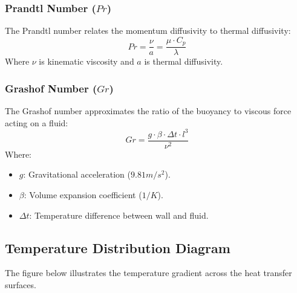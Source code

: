 \subsubsection{Prandtl Number ($Pr$)}\label{pr-number}

The Prandtl number relates the momentum diffusivity to thermal diffusivity:
\begin{equation}
    Pr = \frac{\nu}{a} = \frac{\mu \cdot C_p}{\lambda}
\end{equation}
Where $\nu$ is kinematic viscosity and $a$ is thermal diffusivity.

\subsubsection{Grashof Number ($Gr$)}\label{gr-number}

The Grashof number approximates the ratio of the buoyancy to viscous force acting on a fluid:
\begin{equation}
    Gr = \frac{g \cdot \beta \cdot \Delta t \cdot l^3}{\nu^2}
\end{equation}
Where:
\begin{itemize}
    \item $g$: Gravitational acceleration ($9.81 m/s^2$).
    \item $\beta$: Volume expansion coefficient ($1/K$).
    \item $\Delta t$: Temperature difference between wall and fluid.
\end{itemize}

\subsection{Temperature Distribution Diagram}\label{temp-dist}

The figure below illustrates the temperature gradient across the heat transfer surfaces.

